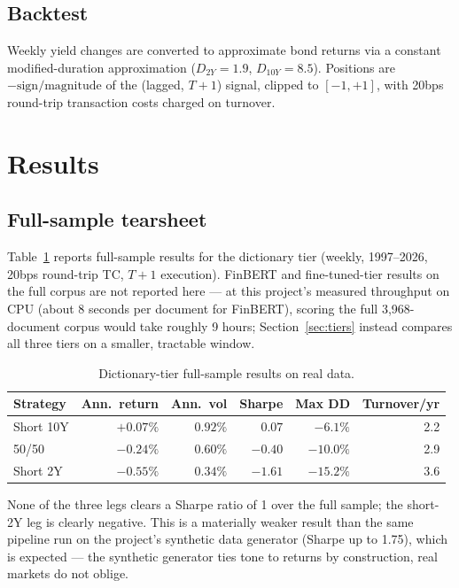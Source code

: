 \documentclass[11pt]{article}
\begin{document}
\subsection{Backtest}

Weekly yield changes are converted to approximate bond returns via a
constant modified-duration approximation ($D_{2Y}=1.9$, $D_{10Y}=8.5$).
Positions are $-\mathrm{sign/magnitude}$ of the (lagged, $T+1$) signal,
clipped to $[-1,+1]$, with 20bps round-trip transaction costs charged on
turnover.

\section{Results}

\subsection{Full-sample tearsheet}

Table~\ref{tab:main} reports full-sample results for the dictionary tier
(weekly, 1997--2026, 20bps round-trip TC, $T{+}1$ execution). FinBERT and
fine-tuned-tier results on the full corpus are not reported here --- at
this project's measured throughput on CPU (about 8 seconds per document
for FinBERT), scoring the full 3,968-document corpus would take roughly
9 hours; Section~\ref{sec:tiers} instead compares all three tiers on a
smaller, tractable window.

\begin{table}[H]
\centering
\begin{tabular}{lrrrrr}
\toprule
Strategy & Ann.\ return & Ann.\ vol & Sharpe & Max DD & Turnover/yr \\
\midrule
Short 10Y   & $+0.07\%$ & $0.92\%$ & $0.07$  & $-6.1\%$  & 2.2 \\
50/50       & $-0.24\%$ & $0.60\%$ & $-0.40$ & $-10.0\%$ & 2.9 \\
Short 2Y    & $-0.55\%$ & $0.34\%$ & $-1.61$ & $-15.2\%$ & 3.6 \\
\bottomrule
\end{tabular}
\caption{Dictionary-tier full-sample results on real data.}
\label{tab:main}
\end{table}

None of the three legs clears a Sharpe ratio of 1 over the full sample;
the short-2Y leg is clearly negative. This is a materially weaker result
than the same pipeline run on the project's synthetic data generator
(Sharpe up to 1.75), which is expected --- the synthetic generator ties
tone to returns by construction, real markets do not oblige.
\end{document}
